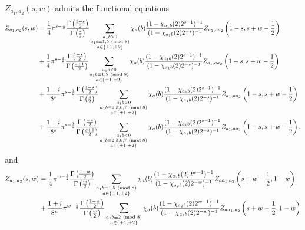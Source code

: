     \begin{theorem}\label{NFthm:double_Dirichlet_series_functional_equation}
        $Z_{a_{1},a_{2}}(s,w)$ admits the functional equations
        \begin{align*}
            Z_{a_{1},a_{2}}(s,w) &= \frac{1}{4}\pi^{s-\frac{1}{2}}\frac{\Gamma\left(\frac{1-s}{2}\right)}{\Gamma\left(\frac{s}{2}\right)}\sum_{\substack{a_{1}b > 0 \\ a_{1}b \equiv 1,5 \ \left(\text{mod }8\right) \\ a \in \{\pm1,\pm2\}}}\chi_{a}(b)\frac{(1-\chi_{a_{1}b}(2)2^{s-1})^{-1}}{(1-\chi_{a_{1}b}(2)2^{-s})^{-1}}Z_{a_{1},aa_{2}}\left(1-s,s+w-\frac{1}{2}\right) \\
            &+\frac{1}{4}\pi^{s-\frac{1}{2}}\frac{\Gamma\left(\frac{-s}{2}\right)}{\Gamma\left(\frac{s+1}{2}\right)}\sum_{\substack{a_{1}b < 0 \\ a_{1}b \equiv 1,5 \ \left(\text{mod }8\right) \\ a \in \{\pm1,\pm2\}}}\chi_{a}(b)\frac{(1-\chi_{a_{1}b}(2)2^{s-1})^{-1}}{(1-\chi_{a_{1}b}(2)2^{-s})^{-1}}Z_{a_{1},aa_{2}}\left(1-s,s+w-\frac{1}{2}\right) \\
            &+\frac{1+i}{8^{s}}\pi^{s-\frac{1}{2}}\frac{\Gamma\left(\frac{1-s}{2}\right)}{\Gamma\left(\frac{s}{2}\right)}\sum_{\substack{a_{1}b > 0 \\ a_{1}b \equiv 2,3,6,7 \ \left(\text{mod }8\right) \\ a \in \{\pm1,\pm2\}}}\chi_{a}(b)\frac{(1-\chi_{a_{1}b}(2)2^{s-1})^{-1}}{(1-\chi_{a_{1}b}(2)2^{-s})^{-1}}Z_{a_{1},aa_{2}}\left(1-s,s+w-\frac{1}{2}\right) \\
            &+\frac{1+i}{8^{s}}\pi^{s-\frac{1}{2}}\frac{\Gamma\left(\frac{-s}{2}\right)}{\Gamma\left(\frac{s+1}{2}\right)}\sum_{\substack{a_{1}b < 0 \\ a_{1}b \equiv 2,3,6,7 \ \left(\text{mod }8\right) \\ a \in \{\pm1,\pm2\}}}\chi_{a}(b)\frac{(1-\chi_{a_{1}b}(2)2^{s-1})^{-1}}{(1-\chi_{a_{1}b}(2)2^{-s})^{-1}}Z_{a_{1},aa_{2}}\left(1-s,s+w-\frac{1}{2}\right).
        \end{align*}
        and
        \begin{align*}
            Z_{a_{1},a_{2}}(s,w) &= \frac{1}{4}\pi^{w-\frac{1}{2}}\frac{\G\left(\frac{1-w}{2}\right)}{\G\left(\frac{w}{2}\right)}\sum_{\substack{a_{1}b \equiv 1,5 \tmod{8} \\ a \in \{\pm1,\pm2\}}}\chi_{a}(b)\frac{(1-\chi_{a_{2}b}(2)2^{w-1})^{-1}}{(1-\chi_{a_{2}b}(2)2^{-w})^{-1}}Z_{aa_{1},a_{2}}\left(s+w-\frac{1}{2},1-w\right) \\
            &+\frac{1+i}{8^{w}}\pi^{w-\frac{1}{2}}\frac{\G\left(\frac{1-w}{2}\right)}{\G\left(\frac{w}{2}\right)}\sum_{\substack{a_{1}b \equiv 2 \tmod{8} \\ a \in \{\pm1,\pm2\}}}\chi_{a}(b)\frac{(1-\chi_{a_{2}b}(2)2^{w-1})^{-1}}{(1-\chi_{a_{2}b}(2)2^{-w})^{-1}}Z_{aa_{1},a_{2}}\left(s+w-\frac{1}{2},1-w\right) \\

\end{align*}
\end{theorem}
